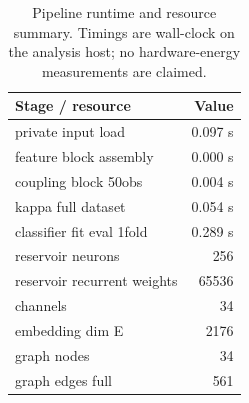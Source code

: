 \begin{table}[t]\centering
\caption{Pipeline runtime and resource summary. Timings are wall-clock on the analysis host; no hardware-energy measurements are claimed.}
\label{tab:runtime_resource}
\begin{tabular}{lr}
\toprule
Stage / resource & Value \\
\midrule
private input load & 0.097 s \\
feature block assembly & 0.000 s \\
coupling block 50obs & 0.004 s \\
kappa full dataset & 0.054 s \\
classifier fit eval 1fold & 0.289 s \\
reservoir neurons & 256 \\
reservoir recurrent weights & 65536 \\
channels & 34 \\
embedding dim E & 2176 \\
graph nodes & 34 \\
graph edges full & 561 \\
\bottomrule
\end{tabular}
\end{table}
